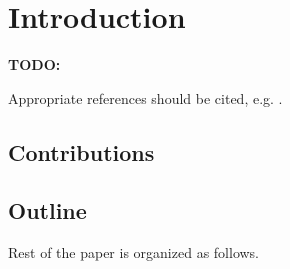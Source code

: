 \section{Introduction}
\label{sec:intro}

{\bf TODO: }

Appropriate references should be cited, e.g. 
\cite{DeanGhemawat2008}. 


\subsection{Contributions}
\label{subsec:contrib}



\subsection{Outline}
\label{subsec:outline}

Rest of the paper is organized as follows.





